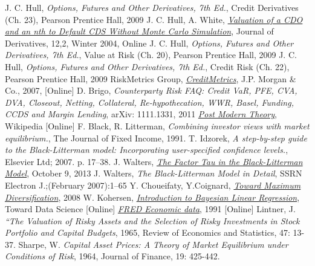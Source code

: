 \begin{thebibliography}{9}
 J. C. Hull, \emph{Options, Futures and Other Derivatives, 7th Ed.}, Credit Derivatives (Ch. 23), Pearson Prentice Hall, 2009
 J. C. Hull, A. White, \href{http://www-2.rotman.utoronto.ca/~hull/downloadablepublications/HullWhiteCDOPaper.pdf}{\emph{Valuation of a CDO and an nth to Default CDS Without Monte Carlo Simulation}}, Journal of Derivatives, 12,2, Winter 2004,  Online 
 J. C. Hull, \emph{Options, Futures and Other Derivatives, 7th Ed.}, Value at Risk (Ch. 20), Pearson Prentice Hall, 2009
 J. C. Hull, \emph{Options, Futures and Other Derivatives, 7th Ed.}, Credit Risk (Ch. 22), Pearson Prentice Hall, 2009
RiskMetrics Group, \href{https://www.msci.com/documents/10199/93396227-d449-4229-9143-24a94dab122f}{\emph{CreditMetrics}}, J.P. Morgan \& Co., 2007, [Online]
 D. Brigo, \emph{Counterparty Risk FAQ: Credit VaR, PFE, CVA, DVA, Closeout, Netting, Collateral, Re-hypothecation, WWR, Basel, Funding, CCDS and Margin Lending}, arXiv: 1111.1331, 2011
\href{https://en.wikipedia.org/wiki/Post-modern_portfolio_theory}{\emph{Post Modern Theory}}, Wikipedia [Online]
 F. Black, R. Litterman, \emph{Combining investor views with market equilibrium.}, The Journal of Fixed Income, 1991.
 T. Idzorek, \emph{A step-by-step guide to the Black-Litterman model: Incorporating user-specified confidence levels.}, Elsevier Ltd; 2007. p. 17–38.
 J. Walters, \href{https://ssrn.com/abstract=1701467}{\emph{The Factor Tau in the Black-Litterman Model}}, October 9, 2013
 J. Walters, \emph{The Black-Litterman Model in Detail}, SSRN Electron J.;(February 2007):1–65
 Y. Choueifaty, Y.Coignard, \href{ https://www.tobam.fr/wp-content/uploads/2014/12/TOBAM-JoPM-Maximum-Div-2008.pdf}{\emph{Toward Maximum Diversification}}, 2008
W. Kohersen, \href{https://towardsdatascience.com/introduction-to-bayesian-linear-regression-e66e60791ea7}{\emph{Introduction to Bayesian Linear Regression}}, Toward Data Science [Online]
\href{https://fred.stlouisfed.org/}{\emph{FRED Economic data}}, 1991 [Online]
 Lintner, J. \emph{“The Valuation of Risky Assets and the Selection of Risky Investments in Stock Portfolio and Capital Budgets}, 1965, Review of Economics and
Statistics, 47: 13-37.
 Sharpe, W. \emph{Capital Asset Prices: A Theory of Market Equilibrium under Conditions of Risk}, 1964, Journal of Finance, 19: 425-442.

\end{thebibliography}
